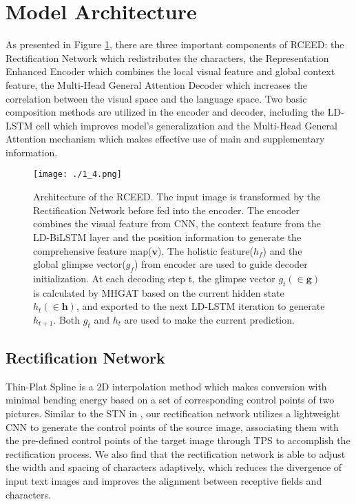\documentclass[runningheads]{llncs}
\begin{document}
\section{Model Architecture}
As presented in Figure \ref{Fig.1}, there are three important components of RCEED: the Rectification Network which redistributes the characters, the Representation Enhanced Encoder which combines the local visual feature and global context feature, the Multi-Head General Attention Decoder which increases the correlation between the visual space and the language space. Two basic composition methods are utilized in the encoder and decoder, including the LD-LSTM cell which improves model's generalization and the Multi-Head General Attention mechanism which makes effective use of main and supplementary information.
\begin{figure}
\vspace{-0.3cm}
\setlength{\belowcaptionskip}{-0.5cm}
\texttt{[image: ./1\_4.png]}
\caption{Architecture of the RCEED. The input image is transformed by the Rectification Network before fed into the encoder. The encoder combines the visual feature from CNN, the context feature from the LD-BiLSTM layer and the position information to generate the comprehensive feature map($\mathbf{v}$). The holistic feature($h_{f}$) and the global glimpse vector($g_{f}$) from encoder are used to guide decoder initialization. At each decoding step t, the glimpse vector $g_{t}( \in \mathbf{g})$ is calculated by MHGAT based on the current hidden state $h_{t}( \in \mathbf{h})$, and exported to the next LD-LSTM iteration to generate $h_{t+1}$. Both $g_{t}$ and $h_{t}$ are used to make the current prediction.} 
\label{Fig.1}
\end{figure}
\subsection{Rectification Network}
Thin-Plat Spline\cite{bookstein1993thin} is a 2D interpolation method which makes conversion with minimal bending energy based on a set of corresponding control points of two pictures. Similar to the STN in \cite{shi2018aster}, our rectification network utilizes a lightweight CNN to generate the control points of the source image, associating them with the pre-defined control points of the target image through TPS to accomplish the rectification process. We also find that the rectification network is able to adjust the width and spacing of characters adaptively, which reduces the divergence of input text images and improves the alignment between receptive fields and characters.
\end{document}
